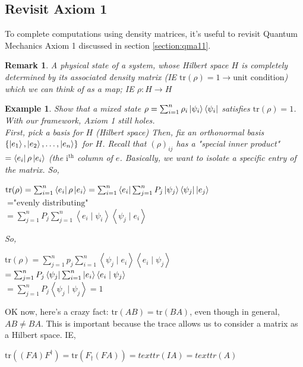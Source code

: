 \documentclass[12pt]{article}
\theoremstyle{plain}
\theoremstyle{nonumberplain}
\theoremstyle{plain}
\newtheorem{example}[lemma]{Example}
\newtheorem{remark}[lemma]{Remark}
\theoremstyle{nonumberplain}
\newcommand\1{{\bf 1}}
\newcommand{\<}{\left\langle}
\renewcommand{\>}{\right\rangle}
\newcommand{\lb}{\left\{}
\newcommand{\rb}{\right\}}
\newcommand{\inp}[2]{\left\langle#1\mid #2\right\rangle} %
\newcommand{\setofkets}[1]{\lb \ket{#1_1}, \ket{#1_2}, \ldots, \ket{#1_n}\rb} %
\begin{document}
\subsection{Revisit Axiom 1}
To complete computations using density matrices, it's useful to revisit Quantum Mechanics Axiom 1 discussed in section \ref{section:qma11}.
\begin{remark}
A physical state of a system, whose Hilbert space $H$ is completely determined by its associated \textit{density matrix} (IE $\text{tr}(\rho)=1\longrightarrow\text{unit condition}$) which we can think of as a map; IE $\rho:H\longrightarrow H$
\end{remark}

\begin{example}
Show that a mixed state $\rho=\sum^n_{i=1}\rho_i\ket{\psi_i}\bra{\psi_i}$ satisfies $\text{tr}(\rho)=1$. With our framework, Axiom 1 still holes.\\
First, pick a basis for $H$ (Hilbert space) Then, fix an orthonormal basis $\setofkets{e}$ for $H$. Recall that $(\rho)_{ij}$ has a "special inner product" $=\bra{e_i}\rho\ket{e_i}$ (the $\text{i}^{\text{th}}$ column of $e$. Basically, we want to isolate a specific entry of the matrix. So, 
\begin{center}
$\text{tr}(\rho)=\sum^n_{i=1}\bra{e_i}\rho\ket{e_i}=\sum^n_{i=1}\bra{e_i}\sum^n_{j=1}P_j\ket{\psi_j}\bra{\psi_j}\ket{e_j}$\\
$=\text{"evenly distributing"}$\\
$=\sum^n_{j=1}P_j\sum^n_{j=1}\inp{e_i}{\psi_i}\inp{\psi_j}{e_i}$
\end{center}
So,
\begin{center}
$\text{tr}(\rho)=\sum^n_{j=1}p_j\sum^n_{i=1}\inp{\psi_j}{e_i}\inp{e_i}{\psi_j}$\\
$=\sum^n_{j=1}P_j\bra{\psi_j}\sum^n_{i=1}\ket{e_i}\inp{e_i}{\psi_j}$\\
$=\sum^n_{j=1}P_j\inp{\psi_j}{\psi_j}=1$
\end{center}
\end{example}
OK now, here's a crazy fact: $\text{tr}(AB)=\text{tr}(BA)$, even though in general, $AB\neq BA$. This is important because the trace allows us to consider a matrix as a Hilbert space. IE, 
\begin{center}
$\text{tr}((FA)F^\dagger)=\text{tr}(F_\dagger(FA))=text{tr}(IA)=text{tr}(A)$
\end{center}

\end{document}
